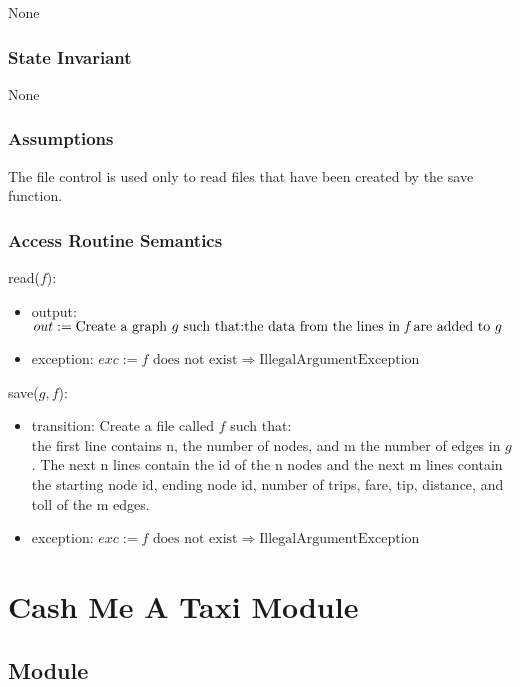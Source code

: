 \documentclass[12pt]{article}
\begin{document}
None

\subsubsection*{State Invariant}

None

\subsubsection* {Assumptions}

The file control is used only to read files that have been created by the save function.

\subsubsection*{Access Routine Semantics}

\noindent read($f$):
\begin{itemize}
	\item output: $out := \text{Create a graph } g \text{ such that:} \\
	\text{the data from the lines in } \textit{f} \text{ are added to } g$
	\item exception: $exc := f\text{ does not exist} \Rightarrow  \mbox{IllegalArgumentException}$
\end{itemize}

\noindent save($g, f$):
\begin{itemize}
	\item transition: Create a file called $f$ such that: \\
	the first line contains n, the number of nodes, and m the number of edges in $g$. The next n lines contain the id of the n nodes and the next m lines contain the starting node id, ending node id, number of trips, fare, tip, distance, and toll of the m edges.
	\item exception: $exc := f\text{ does not exist} \Rightarrow  \mbox{IllegalArgumentException}$
\end{itemize}

\newpage

\section{Cash Me A Taxi Module}

\subsection*{Module}
\end{document}
